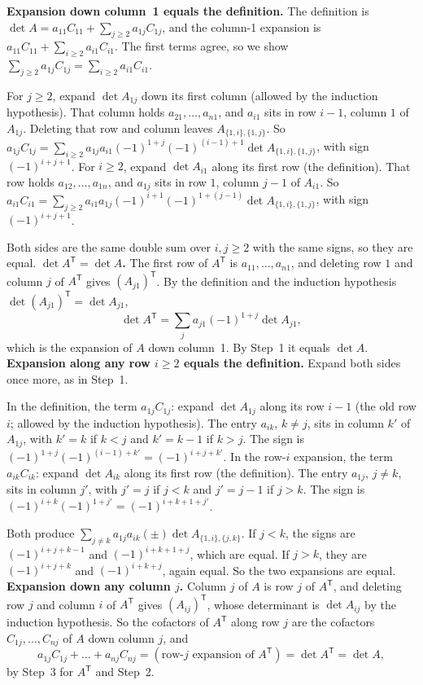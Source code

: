 \documentclass[10pt]{scrartcl}
\begin{document}
\begin{steps}
  \ii \textbf{Expansion down column~1 equals the definition.} The definition is $\det A=a_{11}C_{11}+\sum_{j\ge2}a_{1j}C_{1j}$, and the column-1 expansion is $a_{11}C_{11}+\sum_{i\ge2}a_{i1}C_{i1}$. The first terms agree, so we show $\sum_{j\ge2}a_{1j}C_{1j}=\sum_{i\ge2}a_{i1}C_{i1}$.
  \begin{itemize}
    \ii For $j\ge2$, expand $\det A_{1j}$ down its first column (allowed by the induction hypothesis). That column holds $a_{21},\dots,a_{n1}$, and $a_{i1}$ sits in row $i-1$, column $1$ of $A_{1j}$. Deleting that row and column leaves $A_{\{1,i\},\{1,j\}}$. So $a_{1j}C_{1j}=\sum_{i\ge2}a_{1j}a_{i1}(-1)^{1+j}(-1)^{(i-1)+1}\det A_{\{1,i\},\{1,j\}}$, with sign $(-1)^{i+j+1}$.
    \ii For $i\ge2$, expand $\det A_{i1}$ along its first row (the definition). That row holds $a_{12},\dots,a_{1n}$, and $a_{1j}$ sits in row $1$, column $j-1$ of $A_{i1}$. So $a_{i1}C_{i1}=\sum_{j\ge2}a_{i1}a_{1j}(-1)^{i+1}(-1)^{1+(j-1)}\det A_{\{1,i\},\{1,j\}}$, with sign $(-1)^{i+j+1}$.
  \end{itemize}
  Both sides are the same double sum over $i,j\ge2$ with the same signs, so they are equal.
  \ii \textbf{$\det A^{\mathsf T}=\det A$.} The first row of $A^{\mathsf T}$ is $a_{11},\dots,a_{n1}$, and deleting row $1$ and column $j$ of $A^{\mathsf T}$ gives $(A_{j1})^{\mathsf T}$. By the definition and the induction hypothesis $\det (A_{j1})^{\mathsf T}=\det A_{j1}$,
  \[
    \det A^{\mathsf T}=\sum_{j}a_{j1}(-1)^{1+j}\det A_{j1},
  \]
  which is the expansion of $A$ down column~1. By Step~1 it equals $\det A$.
  \ii \textbf{Expansion along any row $i\ge2$ equals the definition.} Expand both sides once more, as in Step~1.
  \begin{itemize}
    \ii In the definition, the term $a_{1j}C_{1j}$: expand $\det A_{1j}$ along its row $i-1$ (the old row $i$; allowed by the induction hypothesis). The entry $a_{ik}$, $k\ne j$, sits in column $k'$ of $A_{1j}$, with $k'=k$ if $k<j$ and $k'=k-1$ if $k>j$. The sign is $(-1)^{1+j}(-1)^{(i-1)+k'}=(-1)^{i+j+k'}$.
    \ii In the row-$i$ expansion, the term $a_{ik}C_{ik}$: expand $\det A_{ik}$ along its first row (the definition). The entry $a_{1j}$, $j\ne k$, sits in column $j'$, with $j'=j$ if $j<k$ and $j'=j-1$ if $j>k$. The sign is $(-1)^{i+k}(-1)^{1+j'}=(-1)^{i+k+1+j'}$.
  \end{itemize}
  Both produce $\sum_{j\ne k}a_{1j}a_{ik}(\pm)\det A_{\{1,i\},\{j,k\}}$. If $j<k$, the signs are $(-1)^{i+j+k-1}$ and $(-1)^{i+k+1+j}$, which are equal. If $j>k$, they are $(-1)^{i+j+k}$ and $(-1)^{i+k+j}$, again equal. So the two expansions are equal.
  \ii \textbf{Expansion down any column $j$.} Column $j$ of $A$ is row $j$ of $A^{\mathsf T}$, and deleting row $j$ and column $i$ of $A^{\mathsf T}$ gives $(A_{ij})^{\mathsf T}$, whose determinant is $\det A_{ij}$ by the induction hypothesis. So the cofactors of $A^{\mathsf T}$ along row $j$ are the cofactors $C_{1j},\dots,C_{nj}$ of $A$ down column $j$, and
  \[
    a_{1j}C_{1j}+\dots+a_{nj}C_{nj}=(\text{row-}j\text{ expansion of }A^{\mathsf T})=\det A^{\mathsf T}=\det A,
  \]
  by Step~3 for $A^{\mathsf T}$ and Step~2.
\end{steps}
\end{document}
